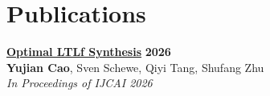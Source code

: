 \documentclass{resume}
\begin{document}
\section{Publications}
\begin{content}
    \href{https://www.ijcai.org/proceedings/2026/4}
    {\textbf{Optimal LTLf Synthesis}} \hfill {\bf 2026} \\
    {\bf Yujian Cao}, Sven Schewe, Qiyi Tang, Shufang Zhu \\
    {\em In Proceedings of IJCAI 2026}

\sectionlineskip
\end{content}

\end{document}
